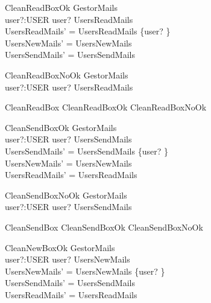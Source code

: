 \begin{schema}{CleanReadBoxOk}
\Delta GestorMails\\
user?:USER
\where
user? \in \dom UsersReadMails \\
UsersReadMails' =  UsersReadMails \oplus \{user? \mapsto \emptyset  \} \\
UsersNewMails' = UsersNewMails \\
UsersSendMails' = UsersSendMails
\end{schema}

\begin{schema}{CleanReadBoxNoOk}
\Xi GestorMails \\
user?:USER
\where
user? \notin \dom UsersReadMails \\
\end{schema}

\begin{zed}
CleanReadBox  CleanReadBoxOk \lor CleanReadBoxNoOk \\
\end{zed}

\begin{schema}{CleanSendBoxOk}
\Delta GestorMails\\
user?:USER
\where
user? \in \dom UsersSendMails \\
UsersSendMails' =  UsersSendMails \oplus \{user? \mapsto \emptyset  \} \\
UsersNewMails' = UsersNewMails \\
UsersReadMails' = UsersReadMails
\end{schema}

\begin{schema}{CleanSendBoxNoOk}
\Xi GestorMails \\
user?:USER
\where
user? \notin \dom UsersSendMails \\
\end{schema}


\begin{zed}
CleanSendBox  CleanSendBoxOk \lor CleanSendBoxNoOk \\
\end{zed}

\begin{schema}{CleanNewBoxOk}
\Delta GestorMails\\
user?:USER
\where
user? \in \dom UsersNewMails \\
UsersNewMails' =  UsersNewMails \oplus \{user? \mapsto \emptyset  \} \\
UsersSendMails' = UsersSendMails \\
UsersReadMails' = UsersReadMails
\end{schema}

